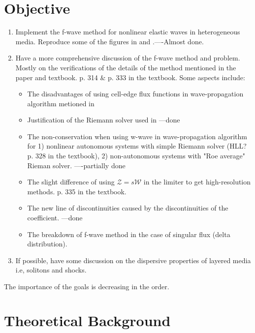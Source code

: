 \documentclass{article}
\begin{document}
\section{Objective}
\begin{enumerate}
\item Implement the f-wave method for nonlinear elastic waves in heterogeneous media. Reproduce some of the figures in \cite{bale2002} \cite{leveque2003} and \cite{ketcheson2012}.----Almost done.
\item Have a more comprehensive discussion of the f-wave method and problem. Mostly on the verifications of the details of the method mentioned in the paper and textbook. p. 314 $\&$ p. 333 in the textbook. Some aspects include:
    \begin{itemize}
    \item The disadvantages of using cell-edge flux functions in wave-propagation algorithm metioned in \cite[p. 957]{bale2002}
    \item Justification of the Riemann solver used in \cite[p. 967]{bale2002}  ---done
    \item The non-conservation when using w-wave in wave-propagation algorithm for 1) nonlinear autonomous systems with simple Riemann solver (HLL? p. 328 in the textbook), 2) non-autonomous systems with "Roe average" Rieman solver.    ----partially done
    \item The slight difference of using $\mathcal{Z}=s\mathcal{W}$ in the limiter to get high-resolution methods. \cite[p. 964]{bale2002} p. 335 in the textbook.
    \item The new line of discontinuities caused by the discontinuities of the coefficient. \cite[p. 960]{bale2002}   ---done
    \item The breakdown of f-wave method in the case of singular flux (delta distribution).  \cite[p. 961]{bale2002}
    \end{itemize}
\item If possible, have some discussion on the dispersive properties of layered media i.e, solitons and shocks.
\end{enumerate}
The importance of the goals is decreasing in the order.
\section{Theoretical Background}
\end{document}
